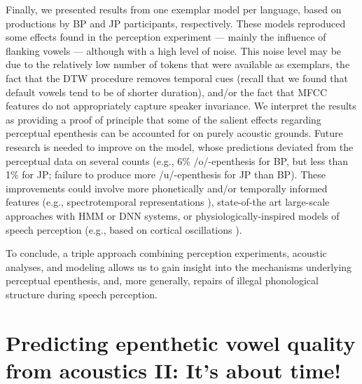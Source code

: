 Finally, we presented results from one exemplar model per language, based on productions by BP and JP participants, respectively. These models reproduced {\color{blue}some effects found in the perception experiment --- mainly the influence of flanking vowels ---} although with a high level of noise. This noise level may be due to the relatively low number of tokens that were available as exemplars, the fact that the DTW procedure removes temporal cues (recall that we found that default vowels tend to be of shorter duration), and/or the fact that MFCC features do not appropriately capture speaker invariance.
We interpret the results as providing a proof of principle that some of the salient effects regarding perceptual epenthesis can be accounted for on purely acoustic grounds. Future research is needed to improve on the model, whose predictions deviated from the perceptual data on several counts (e.g., 6\% /o/-epenthesis for BP, but less than 1\% for JP; failure to produce more /u/-epenthesis for JP than BP). These improvements could involve more phonetically and/or temporally informed features (e.g., spectrotemporal representations \cite{chi2005}), state-of-the art large-scale approaches with HMM or DNN systems, or physiologically-inspired models of speech perception (e.g., based on cortical oscillations \cite{hyafil2015}). 

To conclude, a triple approach combining perception experiments, acoustic analyses, and modeling allows us to gain insight into the mechanisms underlying perceptual epenthesis, and, more generally, repairs of illegal phonological structure during speech perception.



\section{Predicting epenthetic vowel quality from acoustics II: It's about time!} \label{2-parlato-dur}

